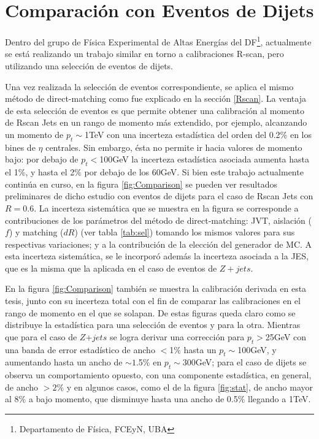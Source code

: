 \chapter{Comparación con Eventos de Dijets}\label{dijets}

Dentro del grupo de Física Experimental de Altas Energías del DF\footnote{Departamento de Física, FCEyN, UBA}, actualmente se está realizando un trabajo similar en torno a calibraciones R-scan, pero utilizando una selección de eventos de dijets.

Una vez realizada la selección de eventos correspondiente, se aplica el mismo método de direct-matching como fue explicado en la sección \ref{Rscan}. La ventaja de esta selección de eventos es que permite obtener una calibración al momento de Rscan Jets en un rango de momento más extendido, por ejemplo, alcanzando un momento de $p_t\sim$1TeV con una incerteza estadística del orden del 0.2$\%$ en los bines de $\eta$ centrales. Sin embargo, ésta no permite ir hacia valores de momento bajo: por debajo de $p_t<$100GeV la incerteza estadística asociada aumenta hasta el 1$\%$, y hasta el 2$\%$ por debajo de los 60GeV. Si bien este trabajo actualmente continúa en curso, en la figura \ref{fig:Comparison} se pueden ver resultados preliminares de dicho estudio con eventos de dijets para el caso de Rscan Jets con $R=$0.6. La incerteza sistemática que se muestra en la figura se corresponde a contribuciones de los parámetros del método de direct-matching: JVT, aislación ($f$) y matching ($dR$) (ver tabla \ref{tab:sel}) tomando los mismos valores para sus respectivas variaciones; y a la contribución de la elección del generador de MC. A esta incerteza sistemática, se le incorporó además la incerteza asociada a la JES, que es la misma que la aplicada en el caso de eventos de $Z+jets$. 

En la figura \ref{fig:Comparison} también se muestra la calibración derivada en esta tesis, junto con su incerteza total con el fin de comparar las calibraciones en el rango de momento en el que se solapan. De estas figuras queda claro como se distribuye la estadística para una selección de eventos y para la otra. Mientras que para el caso de $Z$+$jets$ se logra derivar una corrección para $p_t>$25GeV con una banda de error estadístico de ancho $<$1$\%$ hasta un $p_t\sim$100GeV, y aumentando  hasta un ancho de $\sim1$.5$\%$ en $p_t\sim300$GeV; para el caso de dijets se observa un comportamiento opuesto, con una componente estadística, en general, de ancho $>2\%$ y en algunos casos, como el de la figura \ref{fig:stat}, de ancho mayor al 8$\%$ a bajo momento, que disminuye hasta una ancho de 0.5$\%$ llegando a 1TeV. 

